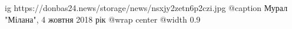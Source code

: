  
 
 
 
 

\ifcmt
  ig https://donbas24.news/storage/news/nsxjy2zetn6p2czi.jpg
	@caption Мурал "Мілана", 4 жовтня 2018 рік
  @wrap center
  @width 0.9
\fi
